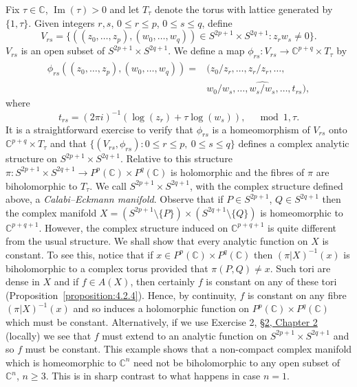 Fix $\tau\in\mathbb C$, $\operatorname{Im}(\tau)>0$ and let $T_\tau$ denote the torus with lattice generated by $\{1,\tau\}$. Given integers $r,s$, $0\leq r\leq p$, $0\leq s\leq q$, define
\[
V_{rs}=\{((z_0,\ldots,z_p),(w_0,\ldots,w_q))\in S^{2p+1}\times S^{2q+1}:z_rw_s\neq0\}.
\]
$V_{rs}$ is an open subset of $S^{2p+1}\times S^{2q+1}$. We define a map $\phi_{rs}:V_{rs}\longrightarrow\mathbb C^{p+q}\times T_\tau$ by
\[
\begin{split}
\phi_{rs}((z_0,\ldots,z_p),(w_0,\ldots,w_q))={}&(z_0/z_r,\ldots,\widehat{z_r/z_r},\ldots,\\
&w_0/w_s,\ldots,\widehat{w_s/w_s},\ldots,t_{rs}),
\end{split}
\]
where
\[
t_{rs}=(2\pi i)^{-1}(\log(z_r)+\tau\log(w_s)),\quad\bmod1,\tau.
\]
It is a straightforward exercise to verify that $\phi_{rs}$ is a homeomorphism of $V_{rs}$ onto $\mathbb C^{p+q}\times T_\tau$ and that $\{(V_{rs},\phi_{rs}):0\leq r\leq p,\ 0\leq s\leq q\}$ defines a complex analytic structure on $S^{2p+1}\times S^{2q+1}$. Relative to this structure $\pi:S^{2p+1}\times S^{2q+1}\longrightarrow P^p(\mathbb C)\times P^q(\mathbb C)$ is holomorphic and the fibres of $\pi$ are biholomorphic to $T_\tau$. We call $S^{2p+1}\times S^{2q+1}$, with the complex structure defined above, a \emph{Calabi--Eckmann manifold}. Observe that if $P\in S^{2p+1}$, $Q\in S^{2q+1}$ then the complex manifold $X=(S^{2p+1}\setminus\{P\})\times(S^{2q+1}\setminus\{Q\})$ is homeomorphic to $\mathbb C^{p+q+1}$. However, the complex structure induced on $\mathbb C^{p+q+1}$ is quite different from the usual structure. We shall show that every analytic function on $X$ is constant. To see this, notice that if
$x\in P^p(\mathbb C)\times P^q(\mathbb C)$ then $(\pi|X)^{-1}(x)$ is biholomorphic to a complex torus provided that $\pi(P,Q)\neq x$. Such tori are dense in $X$ and if $f\in A(X)$, then certainly $f$ is constant on any of these tori (Proposition~\ref{proposition:4.2.4}). Hence, by continuity, $f$ is constant on any fibre $(\pi|X)^{-1}(x)$ and so induces a holomorphic function on $P^p(\mathbb C)\times P^q(\mathbb C)$ which must be constant. Alternatively, if we use Exercise 2, \hyperref[sec:2:2]{\S2, Chapter 2} (locally) we see that $f$ must extend to an analytic function on $S^{2p+1}\times S^{2q+1}$ and so $f$ must be constant. This example shows that a non-compact complex manifold which is homeomorphic to $\mathbb C^n$ need not be biholomorphic to any open subset of $\mathbb C^n$, $n\geq3$. This is in sharp contrast to what happens in case $n=1$.

